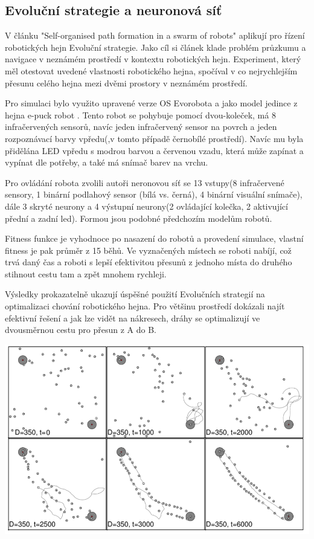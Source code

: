 \subsection{Evoluční strategie a neuronová síť}
V článku "Self-organised path formation in a swarm of robots" \citep{sperati2011self} aplikují pro řízení robotických hejn Evoluční strategie. Jako cíl si článek klade problém průzkumu a navigace v neznámém prostředí v kontextu robotických hejn. Experiment, který měl otestovat uvedené vlastnosti robotického hejna, spočíval v co nejrychlejším přesunu celého hejna mezi dvěmi prostory v neznámém prostředí. 
\par 
Pro simulaci bylo využito upravené verze OS Evorobota a jako model jedince z hejna e-puck robot \citep{mondada2009puck}. Tento robot se pohybuje pomocí dvou-koleček, má 8 infračervených sensorů, navíc jeden infračervený sensor na povrch a jeden rozpoznávací barvy vpředu(,v tomto případě černobílé prostředí). Navíc mu byla přidělána LED vpředu s modrou barvou a červenou vzadu, která může zapínat a vypínat dle potřeby, a také má snímač barev na vrchu. 
\par
Pro ovládání robota zvolili autoři neronovou síť se 13 vstupy(8 infračervené sensory, 1 binární podlahový sensor (bílá vs. černá), 4 binární visuální snímače), dále 3 skryté neurony a 4 výstupní neurony(2 ovládající kolečka, 2 aktivující přední a zadní led). Formou jsou podobné předchozím modelům robotů. 
\par
Fitness funkce je vyhodnoce po nasazení do robotů a provedení simulace, vlastní fitness je pak průměr z 15 běhů. Ve vyznačených místech se roboti nabíjí, což trvá daný čas a roboti s lepší efektivitou přesunů z jednoho místa do druhého stihnout cestu tam a zpět mnohem rychleji.
\par 
Výsledky prokazatelně ukazují úspěšné použití Evolučních strategií na optimalizaci chování robotického hejna. Pro většinu prostředí dokázali najít efektivní řešení a jak lze vidět na nákresech, dráhy se optimalizují ve dvousměrnou cestu pro přesun z A do B.
\par
\begin{center}
    \includegraphics[scale=0.8]{../img/drahyEs.png}
\end{center}


